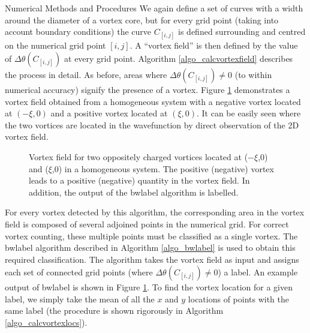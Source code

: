 \begin{chapter}{\label{cha:numerics}Numerical Methods and Procedures}
We again define a set of curves with a width around the diameter of a vortex core, but for every grid point (taking into account boundary conditions) the curve $C_{[i,j]}$ is defined surrounding and centred on the numerical grid point $[i,j]$. A ``vortex field'' is then defined by the value of $\Delta\theta(C_{[i,j]})$ at every grid point. Algorithm \ref{algo_calcvortexfield} describes the process in detail. As before, areas where $\Delta\theta(C_{[i,j]}) \neq 0$ (to within numerical accuracy) signify the presence of a vortex. Figure \ref{fig:vortexfield} demonstrates a vortex field obtained from a homogeneous system with a negative vortex located at $(-\xi,0)$ and a positive vortex located at $(\xi,0)$. It can be easily seen where the two vortices are located in the wavefunction by direct observation of the 2D vortex field.
\begin{figure}
  \centering
  \caption{Vortex field for two oppositely charged vortices located at ($-\xi$,0) and ($\xi$,0) in a homogeneous system. The positive (negative) vortex leads to a positive (negative) quantity in the vortex field. In addition, the output of the bwlabel algorithm is labelled.\label{fig:vortexfield}}
 \end{figure}

For every vortex detected by this algorithm, the corresponding area in the vortex field is composed of several adjoined points in the numerical grid. For correct vortex counting, these multiple points must be classified as a single vortex. The bwlabel algorithm described in Algorithm \ref{algo_bwlabel} is used to obtain this required classification. The algorithm takes the vortex field as input and assigns each set of connected grid points (where $\Delta\theta(C_{[i,j]})\neq 0$) a label. An example output of bwlabel is shown in Figure \ref{fig:vortexfield}. To find the vortex location for a given label, we simply take the mean of all the $x$ and $y$ locations of points with the same label (the procedure is shown rigorously in Algorithm \ref{algo_calcvortexlocs}).


\end{chapter}
